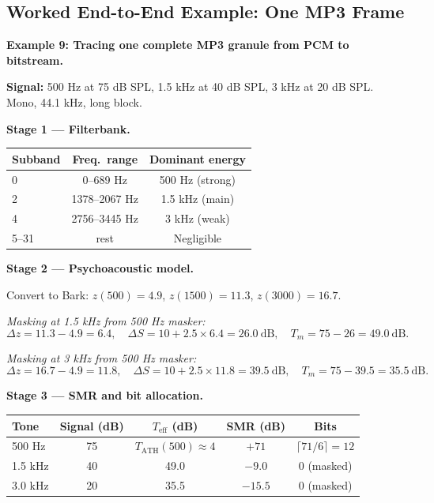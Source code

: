 \subsection{Worked End-to-End Example: One MP3 Frame}

\begin{examplebox}
\textbf{Example 9: Tracing one complete MP3 granule from PCM to bitstream.}

\medskip
\noindent\textbf{Signal:} 500 Hz at 75 dB SPL, 1.5 kHz at 40 dB SPL, 3 kHz at 20 dB SPL. Mono, 44.1 kHz, long block.

\medskip
\noindent\textbf{Stage 1 --- Filterbank.}
\begin{center}
\begin{tabular}{lcc}
\toprule
Subband & Freq.\ range & Dominant energy \\
\midrule
0 & 0--689 Hz    & 500 Hz (strong) \\
2 & 1378--2067 Hz & 1.5 kHz (main) \\
4 & 2756--3445 Hz & 3 kHz (weak) \\
5--31 & rest & Negligible \\
\bottomrule
\end{tabular}
\end{center}

\medskip
\noindent\textbf{Stage 2 --- Psychoacoustic model.}

Convert to Bark: $z(500) = 4.9$, $z(1500) = 11.3$, $z(3000) = 16.7$.

\textit{Masking at 1.5 kHz from 500 Hz masker:}
\[
\Delta z = 11.3 - 4.9 = 6.4,\quad \Delta S = 10 + 2.5\times6.4 = 26.0\ \text{dB},\quad T_m = 75 - 26 = 49.0\ \text{dB}.
\]

\textit{Masking at 3 kHz from 500 Hz masker:}
\[
\Delta z = 16.7 - 4.9 = 11.8,\quad \Delta S = 10 + 2.5\times11.8 = 39.5\ \text{dB},\quad T_m = 75 - 39.5 = 35.5\ \text{dB}.
\]

\medskip
\noindent\textbf{Stage 3 --- SMR and bit allocation.}
\begin{center}
\begin{tabular}{lcccc}
\toprule
Tone & Signal (dB) & $T_{\text{eff}}$ (dB) & SMR (dB) & Bits \\
\midrule
500 Hz  & 75 & $T_{\text{ATH}}(500) \approx 4$ & $+71$ & $\lceil71/6\rceil = 12$ \\
1.5 kHz & 40 & 49.0 & $-9.0$  & 0 (masked) \\
3.0 kHz & 20 & 35.5 & $-15.5$ & 0 (masked) \\
\bottomrule
\end{tabular}
\end{center}


\end{examplebox}
